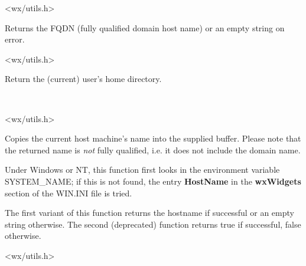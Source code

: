 
<wx/utils.h>


\label{wxgetfullhostname}


Returns the FQDN (fully qualified domain host name) or an empty string on
error.




<wx/utils.h>


\label{wxgethomedir}


Return the (current) user's home directory.


\\


<wx/utils.h>


\label{wxgethostname}



Copies the current host machine's name into the supplied buffer. Please note
that the returned name is {\it not} fully qualified, i.e. it does not include
the domain name.

Under Windows or NT, this function first looks in the environment
variable SYSTEM\_NAME; if this is not found, the entry {\bf HostName}\rtfsp
in the {\bf wxWidgets} section of the WIN.INI file is tried.

The first variant of this function returns the hostname if successful or an
empty string otherwise. The second (deprecated) function returns true
if successful, false otherwise.




<wx/utils.h>


\label{wxgetosdescription}

